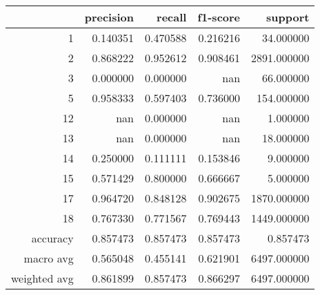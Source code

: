 \begin{tabular}{rrrrr}
\toprule
 & precision & recall & f1-score & support \\
\midrule
1 & 0.140351 & 0.470588 & 0.216216 & 34.000000 \\
2 & 0.868222 & 0.952612 & 0.908461 & 2891.000000 \\
3 & 0.000000 & 0.000000 & nan & 66.000000 \\
5 & 0.958333 & 0.597403 & 0.736000 & 154.000000 \\
12 & nan & 0.000000 & nan & 1.000000 \\
13 & nan & 0.000000 & nan & 18.000000 \\
14 & 0.250000 & 0.111111 & 0.153846 & 9.000000 \\
15 & 0.571429 & 0.800000 & 0.666667 & 5.000000 \\
17 & 0.964720 & 0.848128 & 0.902675 & 1870.000000 \\
18 & 0.767330 & 0.771567 & 0.769443 & 1449.000000 \\
accuracy & 0.857473 & 0.857473 & 0.857473 & 0.857473 \\
macro avg & 0.565048 & 0.455141 & 0.621901 & 6497.000000 \\
weighted avg & 0.861899 & 0.857473 & 0.866297 & 6497.000000 \\
\bottomrule
\end{tabular}
